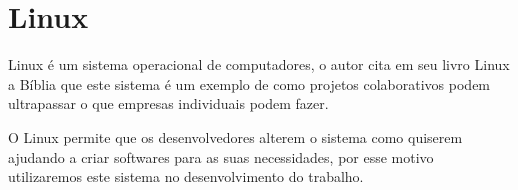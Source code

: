 \section{Linux}

Linux é um sistema operacional de computadores, o autor  cita em seu livro Linux a Bíblia que este sistema é um exemplo de como projetos colaborativos podem ultrapassar o que empresas individuais podem fazer.

O Linux permite que os desenvolvedores alterem o sistema como quiserem ajudando a criar softwares para as suas necessidades, por esse motivo utilizaremos este sistema no desenvolvimento do trabalho.

